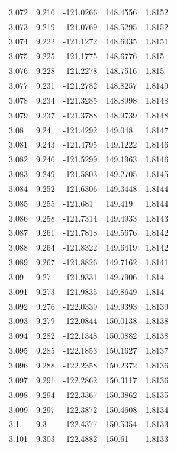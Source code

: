 \begin{tabular}{lllll}
3.072 & 9.216 & -121.0266 & 148.4556 & 1.8152 \\
3.073 & 9.219 & -121.0769 & 148.5295 & 1.8152 \\
3.074 & 9.222 & -121.1272 & 148.6035 & 1.8151 \\
3.075 & 9.225 & -121.1775 & 148.6776 & 1.815 \\
3.076 & 9.228 & -121.2278 & 148.7516 & 1.815 \\
3.077 & 9.231 & -121.2782 & 148.8257 & 1.8149 \\
3.078 & 9.234 & -121.3285 & 148.8998 & 1.8148 \\
3.079 & 9.237 & -121.3788 & 148.9739 & 1.8148 \\
3.08 & 9.24 & -121.4292 & 149.048 & 1.8147 \\
3.081 & 9.243 & -121.4795 & 149.1222 & 1.8146 \\
3.082 & 9.246 & -121.5299 & 149.1963 & 1.8146 \\
3.083 & 9.249 & -121.5803 & 149.2705 & 1.8145 \\
3.084 & 9.252 & -121.6306 & 149.3448 & 1.8144 \\
3.085 & 9.255 & -121.681 & 149.419 & 1.8144 \\
3.086 & 9.258 & -121.7314 & 149.4933 & 1.8143 \\
3.087 & 9.261 & -121.7818 & 149.5676 & 1.8142 \\
3.088 & 9.264 & -121.8322 & 149.6419 & 1.8142 \\
3.089 & 9.267 & -121.8826 & 149.7162 & 1.8141 \\
3.09 & 9.27 & -121.9331 & 149.7906 & 1.814 \\
3.091 & 9.273 & -121.9835 & 149.8649 & 1.814 \\
3.092 & 9.276 & -122.0339 & 149.9393 & 1.8139 \\
3.093 & 9.279 & -122.0844 & 150.0138 & 1.8138 \\
3.094 & 9.282 & -122.1348 & 150.0882 & 1.8138 \\
3.095 & 9.285 & -122.1853 & 150.1627 & 1.8137 \\
3.096 & 9.288 & -122.2358 & 150.2372 & 1.8136 \\
3.097 & 9.291 & -122.2862 & 150.3117 & 1.8136 \\
3.098 & 9.294 & -122.3367 & 150.3862 & 1.8135 \\
3.099 & 9.297 & -122.3872 & 150.4608 & 1.8134 \\
3.1 & 9.3 & -122.4377 & 150.5354 & 1.8133 \\
3.101 & 9.303 & -122.4882 & 150.61 & 1.8133 \\

\end{tabular}
